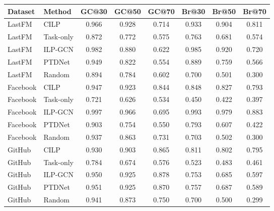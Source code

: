 \scriptsize
\begin{tabular}{@{}llcccccc@{}}
\toprule
Dataset & Method & GC@30 & GC@50 & GC@70 & Br@30 & Br@50 & Br@70 \\
\midrule
LastFM & CILP & 0.966 & 0.928 & 0.714 & 0.933 & 0.904 & 0.811 \\
LastFM & Task-only & 0.872 & 0.772 & 0.575 & 0.763 & 0.681 & 0.574 \\
LastFM & ILP-GCN & 0.982 & 0.880 & 0.622 & 0.985 & 0.920 & 0.720 \\
LastFM & PTDNet & 0.949 & 0.822 & 0.554 & 0.889 & 0.759 & 0.566 \\
LastFM & Random & 0.894 & 0.784 & 0.602 & 0.700 & 0.501 & 0.300 \\
\midrule
Facebook & CILP & 0.947 & 0.923 & 0.844 & 0.848 & 0.827 & 0.793 \\
Facebook & Task-only & 0.721 & 0.626 & 0.534 & 0.450 & 0.422 & 0.397 \\
Facebook & ILP-GCN & 0.997 & 0.966 & 0.695 & 0.993 & 0.979 & 0.883 \\
Facebook & PTDNet & 0.903 & 0.754 & 0.550 & 0.793 & 0.607 & 0.422 \\
Facebook & Random & 0.937 & 0.863 & 0.731 & 0.703 & 0.502 & 0.300 \\
\midrule
GitHub & CILP & 0.930 & 0.903 & 0.865 & 0.811 & 0.802 & 0.795 \\
GitHub & Task-only & 0.784 & 0.674 & 0.576 & 0.523 & 0.483 & 0.461 \\
GitHub & ILP-GCN & 0.950 & 0.925 & 0.878 & 0.753 & 0.685 & 0.597 \\
GitHub & PTDNet & 0.951 & 0.925 & 0.870 & 0.757 & 0.687 & 0.589 \\
GitHub & Random & 0.941 & 0.873 & 0.750 & 0.700 & 0.500 & 0.299 \\
\bottomrule
\end{tabular}
